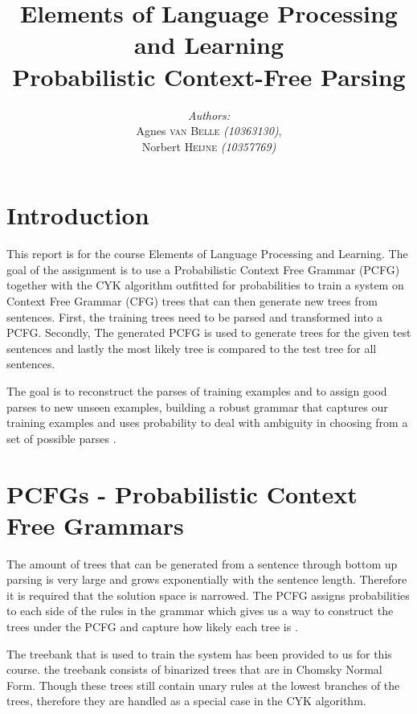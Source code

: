 \documentclass[11pt,twocolumn]{article}
\title{Elements of Language Processing and Learning\\Probabilistic Context-Free Parsing}
\author{
		\emph{Authors:}\\[0.2cm]
		Agnes \textsc{van Belle} \small{ \emph{(10363130)}},\\ 
		Norbert \textsc{Heijne} \small{ \emph{(10357769)}}
		}
\begin{document}
	\maketitle

\section{Introduction}
This report is for the course Elements of Language Processing and Learning. The goal of the assignment is to use a Probabilistic Context Free Grammar (PCFG) together with the CYK algorithm outfitted for probabilities to train a system on Context Free Grammar (CFG) trees that can then generate new trees from sentences. First, the training trees need to be parsed and transformed into a PCFG. Secondly, The generated PCFG is used to generate trees for the given test sentences and lastly the most likely tree is compared to the test tree for all sentences.

The goal is to reconstruct the parses of training examples and to assign good parses to new unseen examples, building a robust grammar that captures our training examples and uses probability to deal with ambiguity in choosing from a set of possible parses \cite{slides2}. 

\section{PCFGs - Probabilistic Context Free Grammars}
The amount of trees that can be generated from a sentence through bottom up parsing is very large and grows exponentially with the sentence length. Therefore it is required that the solution space is narrowed. The PCFG assigns probabilities to each side of the rules in the grammar which gives us a way to construct the trees under the PCFG and capture how likely each tree is \cite{slides2}.

The treebank that is used to train the system has been provided to us for this course. the treebank consists of binarized trees that are in Chomsky Normal Form. Though these trees still contain unary rules at the lowest branches of the trees, therefore they are handled as a special case in the CYK algorithm.
\end{document}

